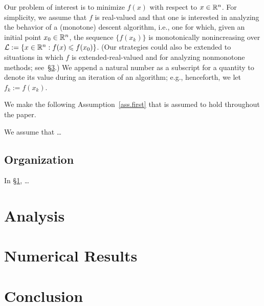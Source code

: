 Our problem of interest is to minimize $f(x)$ with respect to $x \in \mathbb{R}^{n}$.  For simplicity, we assume that $f$ is real-valued and that one is interested in analyzing the behavior of a (monotone) descent algorithm, i.e., one for which, given an initial point $x_0 \in \mathbb{R}^{n}$, the sequence $\{f(x_k)\}$ is monotonically nonincreasing over $\Lcal := \{x \in \R{n} : f(x) \leq f(x_0)\}$.  (Our strategies could also be extended to situations in which $f$ is extended-real-valued and for analyzing nonmonotone methods; see~\S\ref{sec.conclusion}.)  We append a natural number as a subscript for a quantity to denote its value during an iteration of an algorithm; e.g., henceforth, we let $f_k := f(x_k)$.

We make the following Assumption~\ref{ass.first} that is assumed to hold throughout the paper.

\bassumption\label{ass.first}
  We assume that \dots
\eassumption

\subsection{Organization}

In \S\ref{sec.analysis}, \dots

\section{Analysis}\label{sec.analysis}

\section{Numerical Results}\label{sec.numerical}

\section{Conclusion}\label{sec.conclusion}
